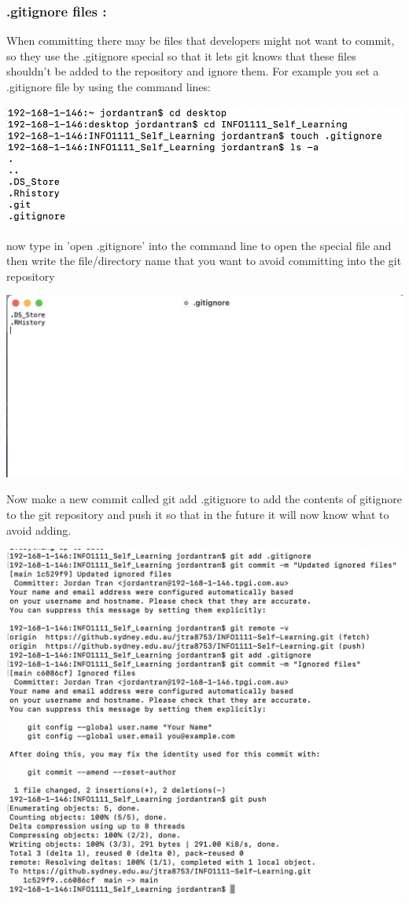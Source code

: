 \documentclass[a4paper, 11pt]{report}
\begin{document}
\subsubsection{.gitignore files \cite{pluralsight}:}

When committing there may be files that developers might not want to commit, so they use the .gitignore special so that it lets git knows that these files shouldn't be added to the repository and ignore them. For example you set a .gitignore file by using the command lines:

\includegraphics[width=\textwidth]{create_gitignore}

now type in 'open .gitignore' into the command line to open the special file and then write the file/directory name that you want to avoid committing into the git repository

\includegraphics[width=\textwidth]{ignore_contents}

Now make a new commit called git add .gitignore to add the contents of gitignore to the git repository and push it so that in the future it will now know what to avoid adding.

\includegraphics[width=\textwidth]{ignore_push}
\end{document}
